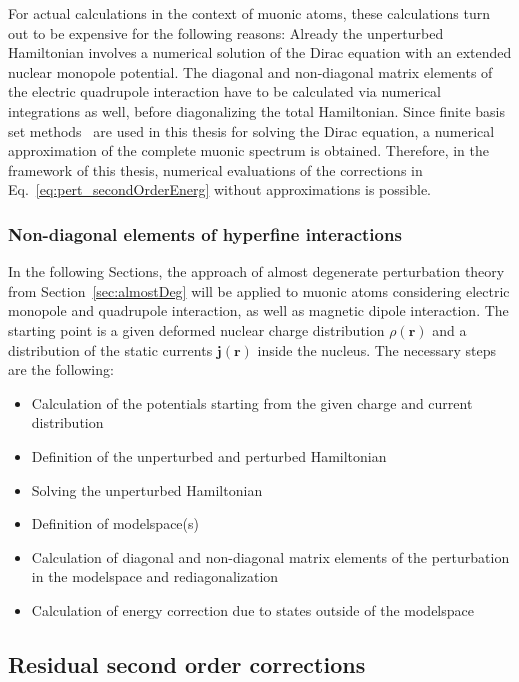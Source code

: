 For actual calculations in the context of muonic atoms, these calculations turn out to be expensive for the following reasons: Already the unperturbed Hamiltonian involves a numerical solution of the Dirac equation with an extended nuclear monopole potential. The diagonal and non-diagonal matrix elements of the electric quadrupole interaction have to be calculated via numerical integrations as well, before diagonalizing the total Hamiltonian. Since finite basis set methods~\cite{Shabaev2004} are used in this thesis for solving the Dirac equation, a numerical approximation of the complete muonic spectrum is obtained. Therefore, in the framework of this thesis, numerical evaluations of the corrections in Eq.~\eqref{eq:pert_secondOrderEnerg} without approximations is possible. 

\subsubsection{Non-diagonal elements of hyperfine interactions}
In the following Sections, the approach of almost degenerate perturbation theory from Section~\ref{sec:almostDeg} will be applied to muonic atoms considering electric monopole and quadrupole interaction, as well as magnetic dipole interaction. The starting point is a given deformed nuclear charge distribution $\rho(\mathbf{r})$ and a distribution of the static currents $\mathbf{j}(\mathbf{r})$ inside the nucleus.
The necessary steps are the following:
\begin{itemize}
\item Calculation of the potentials starting from the given charge and current distribution
\item Definition of the unperturbed  and perturbed Hamiltonian 
\item Solving the unperturbed Hamiltonian
\item Definition of modelspace(s)
\item Calculation of diagonal and non-diagonal matrix elements of the perturbation in the modelspace and rediagonalization
\item Calculation of energy correction due to states outside of the modelspace

\end{itemize}

\subsection{Residual second order corrections}
\label{sec:muon_residualSO}

